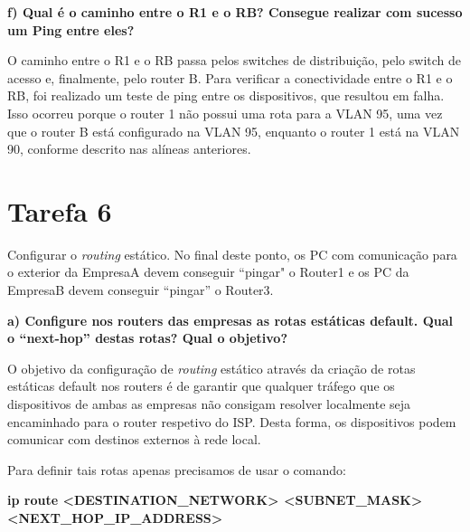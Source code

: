 \documentclass[11pt,english, openright, oneside]{book}
\begin{document}
\vspace{0.8cm}

\textbf{f) Qual é o caminho entre o R1 e o RB? Consegue realizar com sucesso um Ping entre eles?}
\vspace{0.2cm}

O caminho entre o R1 e o RB passa pelos switches de distribuição, pelo switch de
acesso e, finalmente, pelo router B. Para verificar a conectividade entre o R1 e
o RB, foi realizado um teste de ping entre os dispositivos, que resultou em
falha. Isso ocorreu porque o router 1 não possui uma rota para a VLAN 95, uma
vez que o router B está configurado na VLAN 95, enquanto o router 1 está na VLAN 90, conforme descrito nas alíneas anteriores.

\vspace{0.8cm}

\pagebreak
\section{Tarefa 6}
\vspace{0.2cm}

Configurar o \textit{routing} estático. No final deste ponto, os PC com
comunicação para o exterior da EmpresaA devem conseguir “pingar" o Router1 e os
PC da EmpresaB devem conseguir “pingar” o Router3.
\vspace{0.8cm}

\textbf{a) Configure nos routers das empresas as rotas estáticas default. Qual o “next-hop” destas rotas? Qual o objetivo?}
\vspace{0.2cm}

O objetivo da configuração de \textit{routing} estático através da criação de
rotas estáticas default nos routers é de garantir que qualquer tráfego que os
dispositivos de ambas as empresas não consigam resolver localmente seja encaminhado para o router respetivo do ISP. Desta forma, os dispositivos podem comunicar com destinos externos à rede local. \par \vspace{0.2cm}

Para definir tais rotas apenas precisamos de usar o comando: \par \vspace{0.4cm}
\small{\textbf{ip route <DESTINATION\_NETWORK> <SUBNET\_MASK><NEXT\_HOP\_IP\_ADDRESS>}}
\par \vspace{1.2cm}
\end{document}
